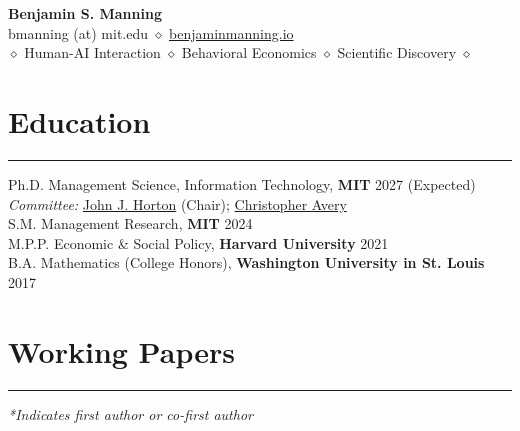 \documentclass[11.25pt]{article}
\begin{document}
\pagestyle{empty} %

\begin{center}
{\huge \textbf{Benjamin S. Manning}}\\
\vspace{2mm}
\large
bmanning (at) mit.edu $\diamond$ \href{https://benjaminmanning.io/}{benjaminmanning.io}\\
\vspace{5mm}
\large
$\diamond$ Human-AI Interaction $\diamond$ Behavioral Economics $\diamond$ Scientific Discovery $\diamond$
\vspace{2mm}
\end{center}


\newenvironment{myindentpar}[1]%
{%
\begin{list}{}%
{%
  \setlength{\leftmargin}{#1}%
  \setlength{\itemsep}{0pt}%
  \setlength{\parskip}{-1pt}%
  \setlength{\topsep}{0pt}%
  \setlength{\parsep}{-5pt}%
}%
\item[]%
}%
{%
\end{list}%
}

\section*{Education} \vspace{-1mm} \hrule
\vspace{3mm}
Ph.D. Management Science, Information Technology, \textbf{MIT} \hfill 2027 (Expected) \\
\indent \textit{Committee:} \href{ahttps://john-joseph-horton.com/}{John J. Horton} (Chair); \href{https://www.hks.harvard.edu/faculty/christopher-norio-avery}{Christopher Avery}\\
S.M. Management Research, \textbf{MIT} \hfill 2024\\
M.P.P. Economic \& Social Policy, \textbf{Harvard University} \hfill 2021\\
B.A. Mathematics (College Honors), \textbf{Washington University in St. Louis} \hfill 2017\\

\vspace{-.45cm}

\section*{Working Papers} \vspace{-1mm} \hrule
\vspace{3mm}
\noindent\emph{*Indicates first author or co-first author}\\
\end{document}
